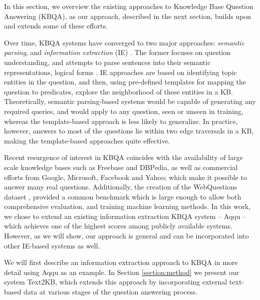 In this section, we overview the existing approaches to Knowledge Base Question Answering (KBQA), as our approach, described in the next section, builds upon and extends some of these efforts. 

Over time, KBQA systems have converged to two major approaches: {\em semantic parsing}, and {\em information extraction} (IE) \cite{yao2014freebase}.
The former focuses on question understanding, and attempts to parse sentences into their semantic representations, \eg logical forms \cite{Berant:EMNLP13,berant2014semantic,berant2015imitation}.
IE approaches \cite{ACCU:2015,yih2015semantic,yao2014information} are based on identifying topic entities in the question, and then, using pre-defined templates for mapping the question to predicates, explore the neighborhood of these entities in a KB.
Theoretically, semantic parsing-based systems would be capable of generating any required queries, and would apply to any question, seen or unseen in training, whereas the template-based approach is less likely to generalize.
In practice, however, answers to most of the questions lie within two edge traversals in a KB, making the template-based approaches quite effective.

Recent resurgence of interest in KBQA coincides with the availability of large scale knowledge bases such as Freebase and DBPedia, as well as commercial efforts from Google, Microsoft, Facebook and Yahoo; which make it possible to answer many real questions.
Additionally, the creation of the WebQuestions dataset \cite{Berant:EMNLP13}, provided a common benchmark which is large enough to allow both comprehensive evaluation, and training machine learning methods.
In this work, we chose to extend an existing information extraction KBQA system -- Aqqu \cite{ACCU:2015} -- which achieves one of the highest scores among publicly available systems.
However, as we will show, our approach is general and can be incorporated into other IE-based systems as well.

We will first describe an information extraction approach to KBQA in more detail using Aqqu as an example.
In Section \ref{section:method} we present our system Text2KB, which extends this approach by incorporating external text-based data at various stages of the question answering process.


